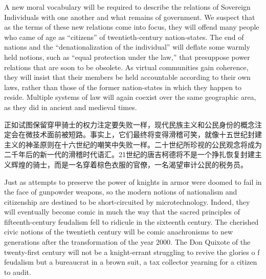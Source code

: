 \begin{paracol}{2}[]
\switchcolumn
A new moral vocabulary will be required to describe the relations of Sovereign Individuals with one another and what remains of government. We suspect that as the terms of these new relations come into focus, they will offend many people who came of age as ``citizens'' of twentieth-century nation-states. The end of nations and the ``denationalization of the individual'' will deflate some warmly held notions, such as ``equal protection under the law,'' that presuppose power relations that are soon to be obsolete. As virtual communities gain coherence, they will insist that their members be held accountable according to their own laws, rather than those of the former nation-states in which they happen to reside. Multiple systems of law will again coexist over the same geographic area, as they did in ancient and medieval times.

\switchcolumn*
正如试图保留穿甲骑士的权力注定要失败一样，现代民族主义和公民身份的概念注定会在微技术面前被短路。事实上，它们最终将变得滑稽可笑，就像十五世纪封建主义的神圣原则在十六世纪的嘲笑中失败一样。二十世纪所珍视的公民观念将成为二千年后的新一代的滑稽时代语汇。21世纪的唐吉柯德将不是一个挣扎恢复封建主义辉煌的骑士，而是一名穿着棕色衣服的官僚，一名渴望审计公民的税务员。

\switchcolumn
Just as attempts to preserve the power of knights in armor were doomed to fail in the face of gunpowder weapons, so the modern notions of nationalism and citizenship are destined to be short-circuited by microtechnology. Indeed, they will eventually become comic in much the way that the sacred principles of fifteenth-century feudalism fell to ridicule in the sixteenth century. The cherished civic notions of the twentieth century will be comic anachronisms to new generations after the transformation of the year 2000. The Don Quixote of the twenty-first century will not be a knight-errant struggling to revive the glories o f feudalism but a bureaucrat in a brown suit, a tax collector yearning for a citizen to audit.
\end{paracol}

